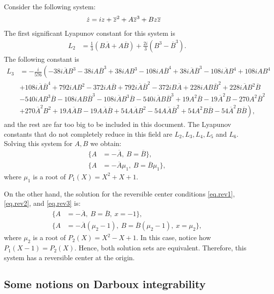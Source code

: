 Consider the following system:
\begin{align}
\dot z &= iz+\overline{z}^2+A\overline{z}^3+Bz\overline{z}
\end{align}
The first significant Lyapunov constant for this system is
\begin{align*}
L_{2}&=\frac{1}{3}(B\overline A+A\overline B)+\frac{2i}{3}(B^3-\overline B^3).
\end{align*}
The following constant is
\begin{align*}
L_3&=-\frac {i}{576}\left(-38i\overline{A}B^3- 38iA\overline{B}^3 +38iAB^3 -108iA\overline{B}^4 +38i\overline{A}\overline{B}^3 -108i\overline{A}B^4 +108iAB^4\right.\\
&+108i \overline{A}\overline{B}^4 +792iAB^2 -372iA\overline{B} +792i\overline{A}\overline{B}^2 -372iB\overline{A} +228iAB\overline{B}^2 +228i\overline{A}B^2\overline{B}\\
&-540iAB^3\overline{B} -108iAB\overline{B}^3 -108i\overline{A}B^3\overline{B} -540i\overline{A}B\overline{B}^3+19A^2\overline{B} -19\overline{A}^2B -270A^2\overline{B}^2\\
&\left.+270\overline{A}^2B^2 +19A\overline{A}B -19A\overline{A}\overline{B} +54A\overline{A}B^2 -54A\overline{A}\overline{B}^2 +54A^2B\overline{B} -54\overline{A}^2B\overline{B}\right), 
\end{align*}
and the rest are far too big to be included in this document. The Lyapunov constants that do not completely reduce in this field are $L_2,L_3,L_4,L_5$ and $L_6$. Solving this system for $A,B$ we obtain:
\begin{align*}
\{A&=-\overline A,~B=\overline B\},\\
\{A&=-\overline A \mu_1,~B=\overline B \mu_1\},
\end{align*}
where $\mu_1$ is a root of $P_1(X)=X^2+X+1$.

On the other hand, the solution for the reversible center conditions \eqref{eq.rev1}, \eqref{eq.rev2}, and \eqref{eq.rev3} is:
\begin{align*}
\{A&=-\overline A,~B=\overline B,~x=-1\},\\
\{A&=-\overline A(\mu_2-1),~B=\overline B(\mu_2-1), ~x=\mu_2\},
\end{align*}
where $\mu_2$ is a root of $P_2(X)=X^2-X+1$. In this case, notice how $P_1(X-1)=P_2(X)$. Hence, both solution sets are equivalent. Therefore, this system has a reversible center at the origin.



\subsection{Some notions on Darboux integrability}

